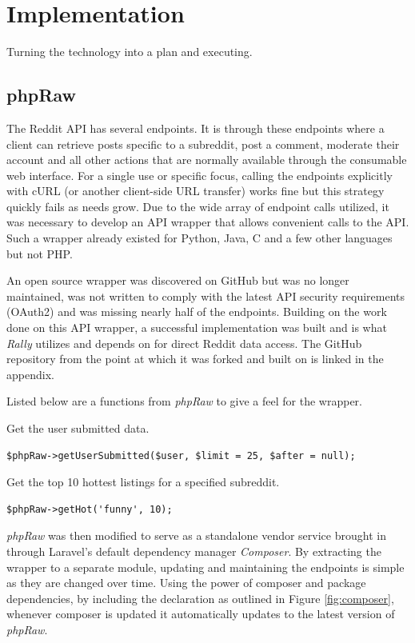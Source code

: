 \documentclass[msc,oneside]{ubcthesis}%
\begin{document}
\chapter{Implementation}
Turning the technology into a plan and executing.
\section{phpRaw}
The Reddit API has several endpoints. It is through these endpoints where a client can retrieve posts specific to a subreddit, post a comment, moderate their account and all other actions that are normally available through the consumable web interface. For a single use or specific focus, calling the endpoints explicitly with cURL (or another client-side URL transfer) works fine but this strategy quickly fails as needs grow. Due to the wide array of endpoint calls utilized, it was necessary to develop an API wrapper that allows convenient calls to the API. Such a wrapper already existed for Python, Java, C and a few other languages but not PHP.
\par
An open source wrapper was discovered on GitHub but was no longer maintained, was not written to comply with the latest API security requirements (OAuth2) and was missing nearly half of the endpoints. Building on the work done on this API wrapper, a successful implementation was built and is what \textit{Rally} utilizes and depends on for direct Reddit data access. The GitHub repository from the point at which it was forked and built on is linked in the appendix.
\par 
Listed below are a functions from \textit{phpRaw} to give a feel for the wrapper.
\begin{center}
Get the user submitted data.
\end{center}
\begin{lstlisting}
$phpRaw->getUserSubmitted($user, $limit = 25, $after = null);
\end{lstlisting}

\begin{center}
Get the top 10 hottest listings for a specified subreddit.
\end{center}
\begin{lstlisting}
$phpRaw->getHot('funny', 10);
\end{lstlisting}
\par
\textit{phpRaw} was then modified to serve as a standalone vendor service brought in through Laravel's default dependency manager \textit{Composer}. By extracting the wrapper to a separate module, updating and maintaining the endpoints is simple as they are changed over time. Using the power of composer and package dependencies, by including the declaration as outlined in Figure \ref{fig:composer}, whenever composer is updated it automatically updates to the latest version of \textit{phpRaw}.
\end{document}
